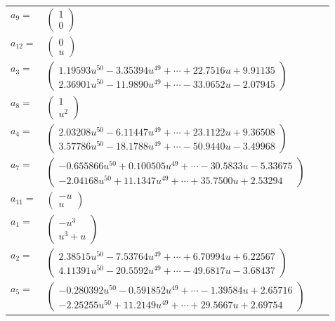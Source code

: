 \documentclass[1p]{elsarticle_modified}
\theoremstyle{definition}
\begin{document}
\begin{tabular}{m{7pt} m{180pt} m{7pt} m{180pt} }
\flushright $a_{9}=$&$\begin{pmatrix}1\\0\end{pmatrix}$ \\
\flushright $a_{12}=$&$\begin{pmatrix}0\\u\end{pmatrix}$ \\
\flushright $a_{3}=$&$\begin{pmatrix}1.19593 u^{50}-3.35394 u^{49}+\cdots+22.7516 u+9.91135\\2.36901 u^{50}-11.9890 u^{49}+\cdots-33.0652 u-2.07945\end{pmatrix}$ \\
\flushright $a_{8}=$&$\begin{pmatrix}1\\u^2\end{pmatrix}$ \\
\flushright $a_{4}=$&$\begin{pmatrix}2.03208 u^{50}-6.11447 u^{49}+\cdots+23.1122 u+9.36508\\3.57786 u^{50}-18.1788 u^{49}+\cdots-50.9440 u-3.49968\end{pmatrix}$ \\
\flushright $a_{7}=$&$\begin{pmatrix}-0.655866 u^{50}+0.100505 u^{49}+\cdots-30.5833 u-5.33675\\-2.04168 u^{50}+11.1347 u^{49}+\cdots+35.7500 u+2.53294\end{pmatrix}$ \\
\flushright $a_{11}=$&$\begin{pmatrix}- u\\u\end{pmatrix}$ \\
\flushright $a_{1}=$&$\begin{pmatrix}- u^3\\u^3+u\end{pmatrix}$ \\
\flushright $a_{2}=$&$\begin{pmatrix}2.38515 u^{50}-7.53764 u^{49}+\cdots+6.70994 u+6.22567\\4.11391 u^{50}-20.5592 u^{49}+\cdots-49.6817 u-3.68437\end{pmatrix}$ \\
\flushright $a_{5}=$&$\begin{pmatrix}-0.280392 u^{50}-0.591852 u^{49}+\cdots-1.39584 u+2.65716\\-2.25255 u^{50}+11.2149 u^{49}+\cdots+29.5667 u+2.69754\end{pmatrix}$ \\

\end{tabular}
\end{document}
